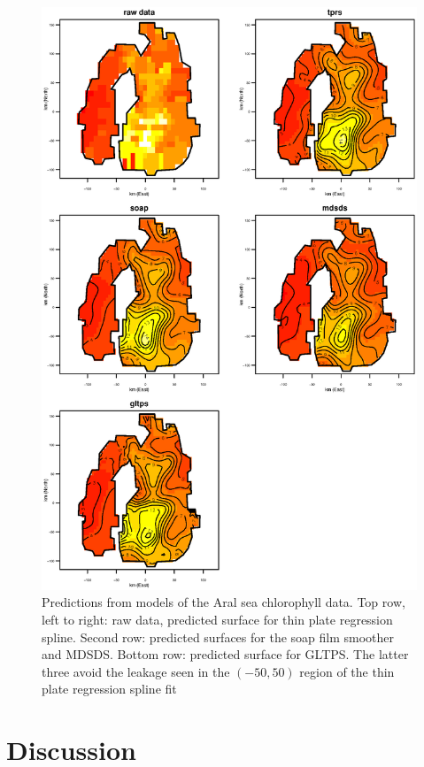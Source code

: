 \documentclass[smallextended]{svjour3}       %
\begin{document}
\begin{figure}
\centering
\includegraphics[height=0.8\textheight]{Fig7.eps}
\caption{Predictions from models of the Aral sea chlorophyll data. Top row, left to right: raw data, predicted surface for thin plate regression spline. Second row: predicted surfaces for the soap film smoother and MDSDS. Bottom row: predicted surface for GLTPS. The latter three avoid the leakage seen in the $(-50, 50)$ region of the thin plate regression spline fit}
\label{aral-plot}
\end{figure}

\section{Discussion}
\label{conclusion}
\end{document}
